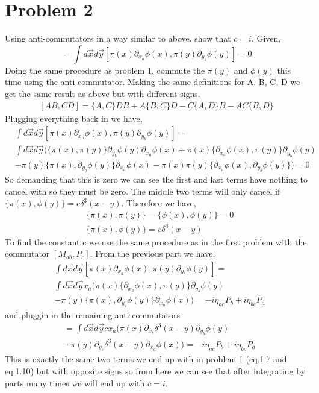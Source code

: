 \documentclass{article}
\numberwithin{equation}{section}
\newcommand{\dxa}{\partial_{x_a}}
\newcommand{\dxb}{\partial_{x_b}}
\newcommand{\dyb}{\partial_{y_b}}
\newcommand{\dyc}{\partial_{y_c}}
\newcommand{\A}  {\pi(x)}
\newcommand{\B}  {\partial_{x_a} \phi(x)}
\newcommand{\C}  {\pi(y)}
\newcommand{\D}  {\partial_{y_b} \phi(y)}
\newcommand{\ddf}{\delta^3(x-y)}
\newcommand{\intdd}{\int d\vec{x} d\vec{y}}
\newcommand{\beq}{\begin{equation}}
\newcommand{\eeq}{\end{equation}}
\begin{document}
\section{Problem 2}

Using anti-commutators in a way similar to above, show that $c=i$. Given,
\beq
    [P_a,P_b]= \intdd[\pi(x) \dxa \phi(x), \pi(y) \dyb \phi(y)] = 0
\eeq
Doing the same procedure as problem 1, commute the $\pi(y)$ and $\phi(y)$ this time using the anti-commutator. Making the same definitions for A, B, C, D we get the same
result as above but with different signs.
\beq \begin{split}
    [AB,CD] = \{A,C\}DB + A\{B,C\}D - C\{A,D\}B - AC\{B,D\}
\end{split} \eeq
Plugging everything back in we have,
\beq \begin{split}
    &\intdd[\A\B,\C\D] = \\
    &\intdd (\{\A,\C\}\D\B + \A\{\B,\C\}\D \\
    &- \C\{\A,\D\}\B - \A\C\{\B,\D\}) = 0
\end{split} \eeq
So demanding that this is zero we can see the first and last terms have nothing to cancel with so they must be zero. The middle two terms will only cancel if
$\{\pi(x),\phi(y)\} = c\ddf$. Therefore we have,
\beq \begin{split}
    & \{\pi(x),\pi(y)\} = \{\phi(x), \phi(y)\} = 0 \\
    & \{\pi(x),\phi(y)\} = c\ddf
\end{split} \eeq
To find the constant c we use the same procedure as in the first problem with the commutator $[M_{ab},P_c]$. From the previous part we have,
\beq \begin{split}
    &\intdd[\A\B,\C\D] = \\
    &\intdd x_a(\A\{\B,\C\}\D \\
    &- \C\{\A,\D\}\B) = -i\eta_{ac}P_b+i\eta_{bc}P_a
\end{split} \eeq
and pluggin in the remaining anti-commutators
\beq \begin{split}
    &= \intdd cx_a(\A\dxb\ddf\D \\
    &- \C\dyc\ddf\B) = -i\eta_{ac}P_b+i\eta_{bc}P_a
\end{split} \eeq
This is exactly the same two terms we end up with in problem 1 (eq.1.7 and eq.1.10) but with opposite signs so from here we can see that after integrating by parts many times we will end up
with $c=i$.
\end{document}
